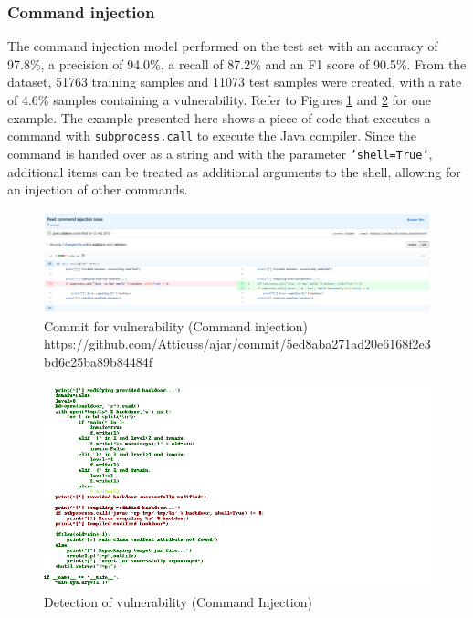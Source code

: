 \documentclass[
a4paper,
pagesize,
pdftex,
12pt,
twoside, %
BCOR=5mm, %
ngerman,
fleqn,
final,
]{scrartcl}
\begin{document}
	\newpage
	\subsubsection{Command injection}
	The command injection model performed on the test set with an accuracy of 97.8\%, a precision of 94.0\%, a recall of 87.2\% and an F1 score of 90.5\%. From the dataset, 51763 training samples and 11073 test samples were created, with a rate of 4.6\% samples containing a vulnerability. Refer to Figures \ref{fig:command_injectionB} and \ref{fig:command_injectionBr} for one example. The example presented here shows a piece of code that executes a command with \texttt{subprocess.call} to execute the Java compiler. Since the command is handed over as a string and with the parameter \texttt{'shell=True'}, additional items can be treated as additional arguments to the shell, allowing for an injection of other commands.
	
	
	\begin{figure}[H]
		\centering
		\includegraphics[width=\linewidth]{Images/command_injectionB}
		\caption{Commit for vulnerability (Command injection) \newline \scriptsize{https://github.com/Atticuss/ajar/commit/5ed8aba271ad20e6168f2e3bd6c25ba89b84484f}}
		\label{fig:command_injectionB}
	\end{figure}
	\begin{figure}[H]
		\centering
		\includegraphics[width=\linewidth]{Images/command_injectionBr}
		\caption{Detection of vulnerability (Command Injection)}
		\label{fig:command_injectionBr}
	\end{figure}
	
\end{document}
